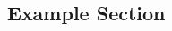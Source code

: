 \documentclass[8pt, a4paper, landscape]{extarticle}
\author{Fabio Bühler, fabuehle@ethz.ch}
\begin{document}
    \setlength{\columnseprule}{0.5pt} %
    \begin{multicols*}{4} %
    \begin{adjustwidth}{1mm}{1mm} %

        \Header{[SUBJECT]}

        \section{Example Section}
            

    \end{adjustwidth}%
    \end{multicols*}
\end{document}
